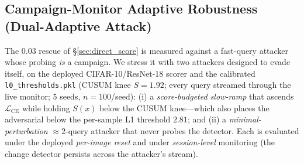 \subsection{Campaign-Monitor Adaptive Robustness (Dual-Adaptive Attack)}
\label{sec:campaign_robust}

The $0.03$ rescue of \S\ref{sec:direct_score} is measured against a fast-query
attacker whose probing \emph{is} a campaign. We stress it with two attackers
designed to evade \sacd itself, on the deployed CIFAR-10/ResNet-18 scorer and
the calibrated \texttt{l0\_thresholds.pkl} (CUSUM knee $S{=}1.92$; every query
streamed through the live monitor; 5 seeds, $n{=}100$/seed): (i) a
\emph{score-budgeted slow-ramp} that ascends \(\mathcal{L}_\text{CE}\) while
holding $S(x)$ below the CUSUM knee---which also places the adversarial below
the per-sample L1 threshold $2.81$; and (ii) a \emph{minimal-perturbation}
${\approx}2$-query attacker that never probes the detector. Each is evaluated
under the deployed \emph{per-image reset} and under \emph{session-level}
monitoring (the change detector persists across the attacker's stream).

\begin{table}[h]
\centering
\small

\caption{%
  Dual-adaptive campaign attack vs.\ \sacd (CIFAR-10/ResNet-18, 5 seeds,
  $n{=}500$/cell). Under the deployed \emph{per-image reset}, the slow-ramp and
  minimal attackers raise the full-system miss to $0.272$ and $0.472$: the
  $0.03$ of Table~\ref{tab:direct_score_sacd} is \emph{not} a universal floor.
  \emph{Session-level} monitoring restores it to $0.002$ and $0.026$; the
  minimal residual shrinks with session length ($0.11$ at $n{=}20$ to $0.026$
  at $n{=}500$), i.e.\ the change detector asymptotically re-accumulates the
  signal. The anchor row (faithful high-query attacker) reproduces the $0.03$
  of Table~\ref{tab:direct_score_sacd}, validating the harness.
}
\label{tab:campaign_robust}
\end{table}


